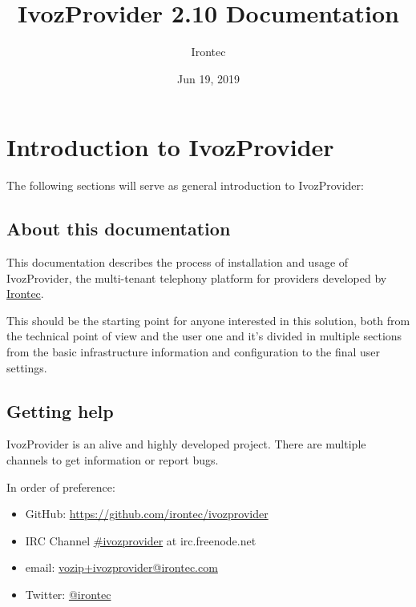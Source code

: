 \documentclass[letterpaper,10pt,english]{sphinxmanual}
\title{IvozProvider 2.10 Documentation}
\date{Jun 19, 2019}
\author{Irontec}
\begin{document}
\maketitle
\tableofcontents
{}\label{index::doc}



\chapter{Introduction to IvozProvider}
\label{basic_concepts/intro/index::doc}\label{basic_concepts/intro/index:introduction-to-ivozprovider}\label{basic_concepts/intro/index:ivozprovider-official-documentation}
The following sections will serve as general introduction to IvozProvider:


\section{About this documentation}
\label{basic_concepts/intro/about::doc}\label{basic_concepts/intro/about:about-this-documentation}
This documentation describes the process of installation and usage of
IvozProvider, the multi-tenant telephony platform for providers developed
by \href{http://irontec.com}{Irontec}.

This should be the starting point for anyone interested in this solution,
both from the technical point of view and the user one and it's divided
in multiple sections from the basic infrastructure information and configuration
to the final user settings.


\section{Getting help}
\label{basic_concepts/intro/getting_help:getting-help}\label{basic_concepts/intro/getting_help::doc}\label{basic_concepts/intro/getting_help:id1}
IvozProvider is an alive and highly developed project. There are
multiple channels to get information or report bugs.

In order of preference:
\begin{itemize}
\item {} 
GitHub: \url{https://github.com/irontec/ivozprovider}

\item {} 
IRC Channel \href{https://webchat.freenode.net/?channels=ivozprovider}{\#ivozprovider} at irc.freenode.net

\item {} 
email: \href{mailto:vozip+ivozprovider@irontec.com}{vozip+ivozprovider@irontec.com}

\item {} 
Twitter: \href{https://twitter.com/irontec}{@irontec}

\end{itemize}
\end{document}
